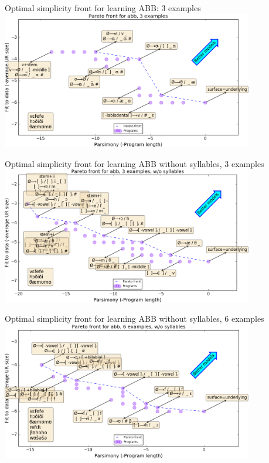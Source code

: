 \documentclass{beamer}
\begin{document}
\begin{frame}{Optimal simplicity front for learning ABB: 3 examples}
  \centering  \includegraphics[width = 11cm]{syllableFront3.png}  
\end{frame}



\begin{frame}{Optimal simplicity front for learning ABB without syllables, 3 examples}
    \centering  \includegraphics[width = 11cm]{front3.png}  
\end{frame}

\begin{frame}{Optimal simplicity front for learning ABB without syllables, 6 examples}
    \centering  \includegraphics[width = 11cm]{front6.png}  
  \end{frame}
\end{document}
